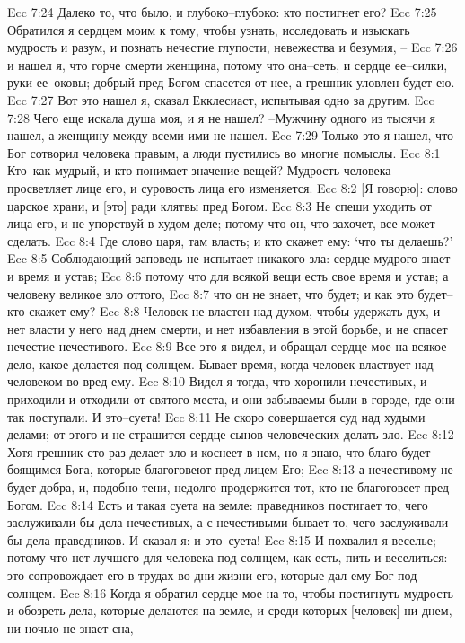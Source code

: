 Ecc 7:24  Далеко то, что было, и глубоко--глубоко: кто постигнет его?
Ecc 7:25  Обратился я сердцем моим к тому, чтобы узнать, исследовать и изыскать мудрость и разум, и познать нечестие глупости, невежества и безумия, --
Ecc 7:26  и нашел я, что горче смерти женщина, потому что она--сеть, и сердце ее--силки, руки ее--оковы; добрый пред Богом спасется от нее, а грешник уловлен будет ею.
Ecc 7:27  Вот это нашел я, сказал Екклесиаст, испытывая одно за другим.
Ecc 7:28  Чего еще искала душа моя, и я не нашел? --Мужчину одного из тысячи я нашел, а женщину между всеми ими не нашел.
Ecc 7:29  Только это я нашел, что Бог сотворил человека правым, а люди пустились во многие помыслы.
Ecc 8:1  Кто--как мудрый, и кто понимает значение вещей? Мудрость человека просветляет лице его, и суровость лица его изменяется.
Ecc 8:2  [Я говорю]: слово царское храни, и [это] ради клятвы пред Богом.
Ecc 8:3  Не спеши уходить от лица его, и не упорствуй в худом деле; потому что он, что захочет, все может сделать.
Ecc 8:4  Где слово царя, там власть; и кто скажет ему: `что ты делаешь?'
Ecc 8:5  Соблюдающий заповедь не испытает никакого зла: сердце мудрого знает и время и устав;
Ecc 8:6  потому что для всякой вещи есть свое время и устав; а человеку великое зло оттого,
Ecc 8:7  что он не знает, что будет; и как это будет--кто скажет ему?
Ecc 8:8  Человек не властен над духом, чтобы удержать дух, и нет власти у него над днем смерти, и нет избавления в этой борьбе, и не спасет нечестие нечестивого.
Ecc 8:9  Все это я видел, и обращал сердце мое на всякое дело, какое делается под солнцем. Бывает время, когда человек властвует над человеком во вред ему.
Ecc 8:10  Видел я тогда, что хоронили нечестивых, и приходили и отходили от святого места, и они забываемы были в городе, где они так поступали. И это--суета!
Ecc 8:11  Не скоро совершается суд над худыми делами; от этого и не страшится сердце сынов человеческих делать зло.
Ecc 8:12  Хотя грешник сто раз делает зло и коснеет в нем, но я знаю, что благо будет боящимся Бога, которые благоговеют пред лицем Его;
Ecc 8:13  а нечестивому не будет добра, и, подобно тени, недолго продержится тот, кто не благоговеет пред Богом.
Ecc 8:14  Есть и такая суета на земле: праведников постигает то, чего заслуживали бы дела нечестивых, а с нечестивыми бывает то, чего заслуживали бы дела праведников. И сказал я: и это--суета!
Ecc 8:15  И похвалил я веселье; потому что нет лучшего для человека под солнцем, как есть, пить и веселиться: это сопровождает его в трудах во дни жизни его, которые дал ему Бог под солнцем.
Ecc 8:16  Когда я обратил сердце мое на то, чтобы постигнуть мудрость и обозреть дела, которые делаются на земле, и среди которых [человек] ни днем, ни ночью не знает сна, --
